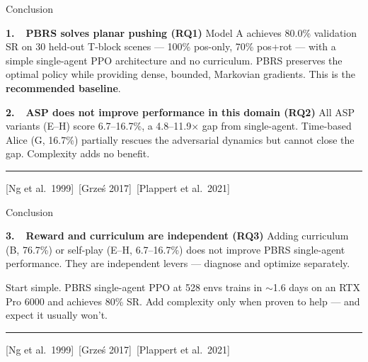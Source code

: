 \documentclass[aspectratio=169,xcolor=dvipsnames,t]{beamer}
\newcommand{\litfooter}[1]{%
  \vspace{2pt}%
  \hrule%
  \vspace{2pt}%
  {\tiny\color{LightDarkGrey} #1}%
}
\begin{document}
\begin{frame}[t]{Conclusion}
  \begin{block}{\textbf{1.\ \ PBRS solves planar pushing (RQ1)}}
    Model A achieves \textcolor{hlgreen}{80.0\% validation SR} on 30 held-out T-block scenes — 100\% pos-only, 70\% pos+rot — with a simple single-agent PPO architecture and no curriculum. PBRS preserves the optimal policy while providing dense, bounded, Markovian gradients. This is the \textbf{recommended baseline}.
  \end{block}

  \vspace{1pt}
  \begin{block}{\textbf{2.\ \ ASP does not improve performance in this domain (RQ2)}}
    All ASP variants (E–H) score 6.7--16.7\%, a 4.8--11.9$\times$ gap from single-agent. Time-based Alice (G, 16.7\%) partially rescues the adversarial dynamics but cannot close the gap. Complexity adds no benefit.
  \end{block}

  \vfill\litfooter{[Ng et al.\ 1999]~[Grze\'s 2017]~[Plappert et al.\ 2021]}
\end{frame}

\begin{frame}[t]{Conclusion}
  \begin{block}{\textbf{3.\ \ Reward and curriculum are independent (RQ3)}}
    Adding curriculum (B, 76.7\%) or self-play (E–H, 6.7–16.7\%) does not improve PBRS single-agent performance. They are independent levers — diagnose and optimize separately.
  \end{block}

  \vspace{1pt}
  {\small Start simple. PBRS single-agent PPO at 528 envs trains in $\sim$1.6 days on an RTX Pro 6000 and achieves 80\% SR. Add complexity only when proven to help — and expect it usually won't.}

  \vfill\litfooter{[Ng et al.\ 1999]~[Grze\'s 2017]~[Plappert et al.\ 2021]}
\end{frame}
\end{document}

